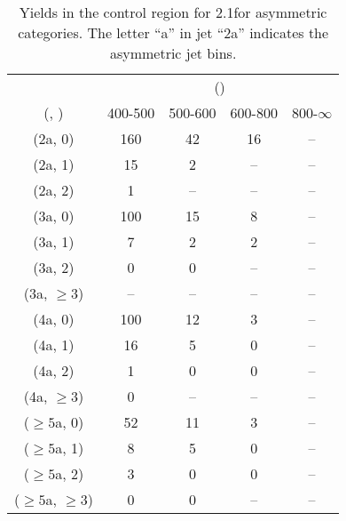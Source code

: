 \begin{table}[h!]
\tiny
\centering
\caption{Yields in the \gj control region for 2.1\ifb for asymmetric categories. The letter ``a'' in jet \eg ``2a''  indicates the asymmetric jet bins.\label{tab:yieldssep_gj_data_asym}}
\begin{tabular}
{ccccc}
	\hline\hline
	& \multicolumn{4}{c}{\scalht (\gev)} \\ 
	 (\njet,  \nb) & 400-500 & 500-600 & 600-800 & 800-$\infty$ \\ [0.8ex] 
\hline
	(2a, 0) & 160 & 42 & 16 & -- \\[0.5ex] 
	(2a, 1) & 15 & 2 & -- & -- \\[0.5ex] 
	(2a, 2) & 1 & -- & -- & -- \\[0.5ex] 
	(3a, 0) & 100 & 15 & 8 & -- \\[0.5ex] 
	(3a, 1) & 7 & 2 & 2 & -- \\[0.5ex] 
	(3a, 2) & 0 & 0 & -- & -- \\[0.5ex] 
	(3a, $\ge3$) & -- & -- & -- & -- \\[0.5ex] 
	(4a, 0) & 100 & 12 & 3 & -- \\[0.5ex] 
	(4a, 1) & 16 & 5 & 0 & -- \\[0.5ex] 
	(4a, 2) & 1 & 0 & 0 & -- \\[0.5ex] 
	(4a, $\ge3$) & 0 & -- & -- & -- \\[0.5ex] 
	($\ge5$a, 0) & 52 & 11 & 3 & -- \\[0.5ex] 
	($\ge5$a, 1) & 8 & 5 & 0 & -- \\[0.5ex] 
	($\ge5$a, 2) & 3 & 0 & 0 & -- \\[0.5ex] 
	($\ge5$a, $\ge3$) & 0 & 0 & -- & -- \\[0.5ex] 
	\hline
	\hline
\end{tabular}
\end{table}
